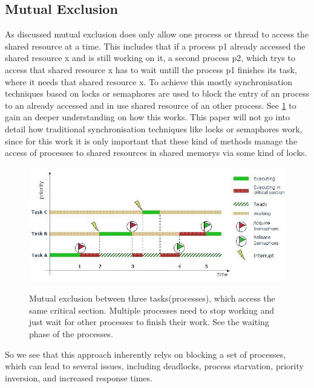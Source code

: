 \subsection{Mutual Exclusion}\label{subsec:mutual-exclusion}

As discussed mutual exclusion does only allow one process or thread to access the shared resource at a time. This includes that if a process p1 already accessed the shared resource x and is still working on it, a second process p2, which trys to access that shared resource x has to wait untill the process p1 finishes its task, where it needs that shared resource x. To achieve this mostly synchronisation techniques based on locks or semaphores are used to block the entry of an process to an already accessed and in use shared resource of an other process. See \cref{fig:mutual-exclusion} to gain an deeper understanding on how this works. This paper will not go into detail how traditional synchronisation techniques like locks or semaphores work, since for this work it is only important that these kind of methods manage the access of processes to shared resources in shared memorys via some kind of locks.

\begin{figure}[h!]
   \centering
   \captionsetup{justification=centering}
   \caption{Mutual exclusion between three tasks(processes), which access the same critical section. Multiple processes need to stop working and just wait for other processes to finish their work. See the waiting phase of the processes. \cite{MutualExclusion}}
   \includegraphics[width=135mm]{images/mutual_exclusion.jpg}
   \label{fig:mutual-exclusion}
\end{figure}

So we see that this approach inherently relys on blocking a set of processes, which can lead to several issues, including deadlocks, process starvation, priority inversion, and increased response times. \cite{brandenburg2019multiprocessorrealtimelockingprotocols}

